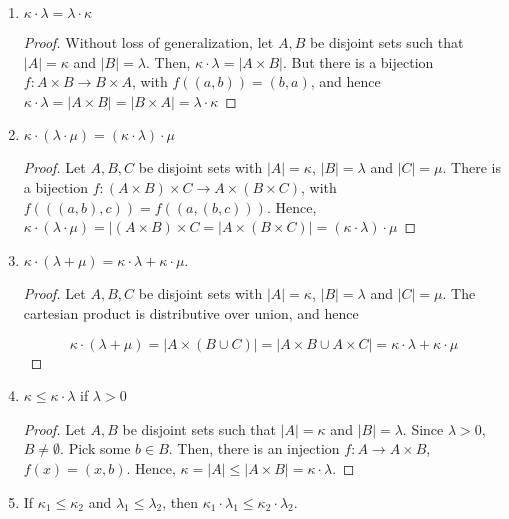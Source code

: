 \begin{enumerate}
    \item $\kappa \cdot \lambda = \lambda \cdot \kappa$
    \begin{proof}
    Without loss of generalization, let $A,B$ be disjoint sets such that $|A| = \kappa$ and $|B| = \lambda$. Then, $\kappa \cdot \lambda = |A \times B|$. But there is a bijection $f: A \times B \rightarrow B \times A$, with $f((a,b)) = (b,a)$, and hence $\kappa \cdot \lambda = |A \times B| = |B \times A| = \lambda \cdot \kappa$
    \end{proof}
    
    \item $\kappa \cdot (\lambda \cdot \mu) = (\kappa \cdot \lambda) \cdot \mu$
    
    \begin{proof}
    Let $A,B,C$ be disjoint sets with $|A| = \kappa$, $|B| = \lambda$ and $|C| = \mu$. There is a bijection $f: (A \times B) \times C \rightarrow A \times (B \times C)$, with $f(((a, b), c)) = f((a, (b,c)))$. Hence, $\kappa \cdot (\lambda \cdot \mu) =  |(A \times B) \times C = |A \times (B \times C)| = (\kappa \cdot \lambda) \cdot \mu$
    \end{proof}
    
    \item $\kappa \cdot (\lambda + \mu) = \kappa \cdot \lambda + \kappa \cdot \mu$.
    
    \begin{proof}
    Let $A,B,C$ be disjoint sets with $|A| = \kappa$, $|B| = \lambda$ and $|C| = \mu$. The cartesian product is distributive over union, and hence
    
    $$ \kappa \cdot (\lambda + \mu) = |A \times (B\cup C)| = |A \times B \cup A \times C| = \kappa \cdot \lambda + \kappa \cdot \mu $$
    \end{proof}
    
    \item $\kappa \leq \kappa \cdot \lambda$ if $\lambda > 0$
     \begin{proof}
    Let $A,B$ be disjoint sets such that $|A| = \kappa $ and $|B| = \lambda$. Since $\lambda > 0$, $B \neq \emptyset$. Pick some $b \in B$. Then, there is an injection $f: A \rightarrow A \times B$, $f(x) = (x, b)$. Hence, $\kappa = |A| \leq |A \times B| = \kappa \cdot \lambda$.
    \end{proof}
    
    \item If $\kappa_1 \leq \kappa_2$ and $\lambda_1 \leq \lambda_2$, then $\kappa_1 \cdot \lambda_1 \leq \kappa_2 \cdot \lambda_2$.
    

\end{enumerate}
